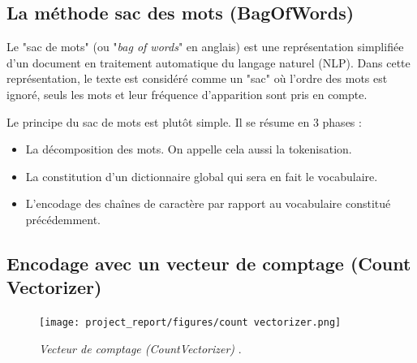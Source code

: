 

\subsection{La méthode sac des mots (BagOfWords)}
Le "sac de mots" (ou "\textit{bag of words}" en anglais) est une représentation simplifiée d'un document en traitement automatique du langage naturel (NLP). Dans cette représentation, le texte est considéré comme un "sac" où l'ordre des mots est ignoré, seuls les mots et leur fréquence d'apparition sont pris en compte. \par 
Le principe du sac de mots est plutôt simple. Il se résume en 3 phases :
\begin{itemize}
    \item La décomposition des mots. On appelle cela aussi la tokenisation.
    \item La constitution d’un dictionnaire global qui sera en fait le vocabulaire.
    \item L’encodage des chaînes de caractère par rapport au vocabulaire constitué précédemment.
\end{itemize}

\subsection{Encodage avec un vecteur de comptage (Count Vectorizer)}

\begin{figure}[h]
    \centering
    \texttt{[image: project\_report/figures/count vectorizer.png]} 
    \caption{\textit{Vecteur de comptage (CountVectorizer)} \cite{shandeep92}.}
        \label{fig:figureCV}
 
\end{figure}

